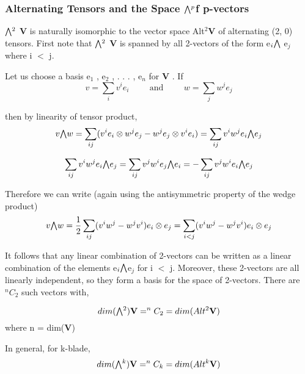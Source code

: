 \subsubsection{Alternating Tensors and the Space \texorpdfstring{$\exterior^p$} of p-vectors}
$\exterior^2$ \textbf{V} is naturally isomorphic to the vector space Alt$^2 \textbf{V}$ of alternating (2, 0) tensors. 
First note that $\exterior^2$ \textbf{V} is spanned by all 2-vectors of the form
e$_i\exterior$ e$_j$ where i $<$ j.

Let us choose a basis {e$_1$ , e$_2$ , . . . , e$_n$ } for \textbf{V} . If
\begin{equation}
    v = \sum_{i}v^ie_i \hspace{1cm} \text{and} \hspace{1cm} w = \sum_{j}w^je_j
\end{equation}

then by linearity of tensor product,
\begin{equation}
    v \exterior w = \sum_{ij} (v^ie_i \otimes w^je_j - w^je_j \otimes v^ie_i) = \sum_{ij}v^iw^j e_i \exterior e_j
\end{equation}

\begin{equation}
    \sum_{ij}v^iw^j e_i \exterior e_j = \sum_{ij}v^jw^i e_j \exterior e_i = - \sum_{ij}v^jw^i e_i \exterior e_j
\end{equation}

Therefore we can write (again using the antisymmetric property of the wedge
product)
\begin{equation}
    v \exterior w = \frac{1}{2} \sum_{ij} (v^iw^j - w^jv^i) e_i \otimes e_j = \sum_{i<j} (v^iw^j - w^jv^i) e_i \otimes e_j
\end{equation}

It follows that any linear combination of 2-vectors can be written as a linear combination
of the elements e$_i \exterior $e$_j$ for i $<$ j. Moreover, these 2-vectors are all linearly
independent, so they form a basis for the space of 2-vectors. There are $^nC_2$ such vectors with,

\begin{equation}
    dim(\exterior ^2)\textbf{V} = ^nC_2 =  dim(Alt^2 \textbf{V})
\end{equation}
where n = dim(\textbf{V})

In general, for k-blade,  
\begin{equation}
    dim(\exterior ^k)\textbf{V} = ^nC_k =  dim(Alt^k \textbf{V})
\end{equation}

